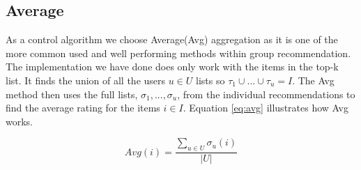 \subsection{Average}\label{sec:average}
As a control algorithm we choose Average(Avg) aggregation as it is one of the more common used and well performing methods within group recommendation. The implementation we have done does only work with the items in the top-k list. It finds the union of all the users $u\in U$ lists so $\tau_1 \cup ... \cup \tau_u = I$. The Avg method then uses the full lists, $\sigma_1, ..., \sigma_u$, from the individual recommendations to find the average rating for the items $i \in I$. Equation \ref{eq:avg} illustrates how Avg works.

\begin{equation}\label{eq:avg}
Avg(i) = \frac{\sum_{u \in U} \sigma_u(i)}{|U|} 
\end{equation}

